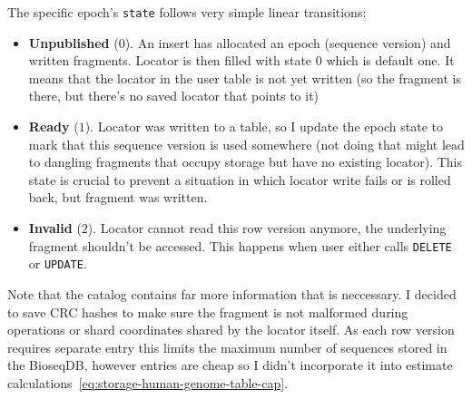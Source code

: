 The specific epoch's \texttt{state} follows very simple linear transitions:
\begin{itemize}
  \item \textbf{Unpublished} ($0$). An insert has allocated an epoch (sequence version) and written fragments.
   Locator is then filled with state $0$ which is default one. It means that the locator in the user table is not yet written
   (so the fragment is there, but there's no saved locator that points to it)
  \item \textbf{Ready} ($1$). Locator was written to a table, so I update the epoch state to mark that this sequence version is used somewhere
   (not doing that might lead to dangling fragments that occupy storage but have no existing locator). This state is crucial to prevent a situation in which locator write fails or is rolled back, but fragment was written.
  \item \textbf{Invalid} ($2$). Locator cannot read this row version anymore, the underlying fragment shouldn't be accessed.
    This happens when user either calls \texttt{DELETE} or \texttt{UPDATE}.
\end{itemize}

Note that the catalog contains far more information that is neccessary. I decided to save CRC hashes to make sure the fragment is not malformed during operations
or shard coordinates shared by the locator itself. As each row version requires separate entry this limits the maximum number of sequences stored in the BioseqDB, however
entries are cheap so I didn't incorporate it into estimate calculations~\ref{eq:storage-human-genome-table-cap}.

